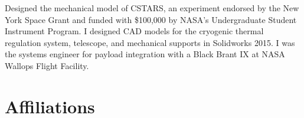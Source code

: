 \documentclass[10pt,final,sans]{resume}
\begin{document}
Designed the mechanical model of CSTARS, an experiment endorsed by the New York Space Grant and funded with \$100,000 by NASA's Undergraduate Student Instrument Program. I designed CAD models for the cryogenic thermal regulation system, telescope, and mechanical supports in Solidworks 2015. I was the systems engineer for payload integration with a Black Brant IX at NASA Wallops Flight Facility.





\section{Affiliations}
\end{document}
